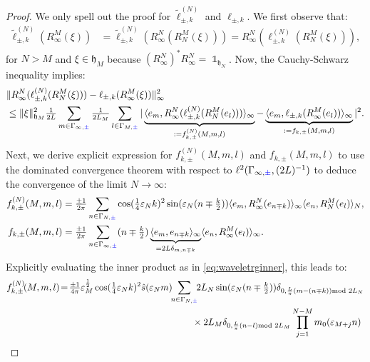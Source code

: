 \documentclass[a4paper, 11pt]{article}
\newcommand{\fh}{\mathfrak{h}}
\newcommand{\ltwo}{\ell^{2}}
\DeclareMathOperator{\1}{\mathds{1}}
\begin{document}
\begin{proof}
We only spell out the proof for $\tilde{\ell}^{(N)}_{\pm,k}$ and $\ell_{\pm,k}$. We first observe that:
\begin{align*}
\tilde{\ell}^{(N)}_{\pm,k}(R^{M}_{\infty}(\xi)) & = \tilde{\ell}^{(N)}_{\pm,k}(R^{N}_{\infty}(R^{M}_{N}(\xi))) = R^{N}_{\infty}(\ell^{(N)}_{\pm,k}(R^{M}_{N}(\xi))),
\end{align*}
for $N>M$ and $\xi\in\fh_{M}$ because $(R^{N}_{\infty})^{*}R^{N}_{\infty} = \1_{\fh_{N}}$. Now, the Cauchy-Schwarz inequality implies:
\begin{align*}
& \|R^{N}_{\infty}(\ell^{(N)}_{\pm,k}(R^{M}_{N}(\xi))) - \ell_{\pm,k}(R^{M}_{\infty}(\xi))\|_{\infty}^{2} \\ 
& \leq \|\xi\|_{\fh_{M}}^{2}\tfrac{1}{2L}\sum_{m\in\Gamma_{\infty,{\color{blue}\pm}}}\tfrac{1}{2L_{M}}\sum_{l\in\Gamma_{M,{\color{blue}\pm}}}|\underbrace{\langle e_{m},R^{N}_{\infty}(\ell^{(N)}_{\pm,k}(R^{M}_{N}(e_{l})))\rangle_{\infty}}_{:=f^{(N)}_{k,\pm}(M,m,l)}-\underbrace{\langle e_{m},\ell_{\pm,k}(R^{M}_{\infty}(e_{l}))\rangle_{\infty}}_{:=f_{k,\pm}(M,m,l)}|^{2}.
\end{align*}
Next, we derive explicit expression for $f^{(N)}_{k,\pm}(M,m,l)$ and $f_{k,\pm}(M,m,l)$ to use the dominated convergence theorem with respect to $\ltwo(\Gamma_{\infty,{\color{blue}\pm}},(2L)^{-1})$ to deduce the convergence of the limit $N\rightarrow\infty$:
\begin{align*}
f^{(N)}_{k,\pm}(M,m,l) & = \tfrac{\pm1}{2\pi}\sum_{n\in\Gamma_{N,{\color{blue}\pm}}}\cos(\tfrac{1}{4}\varepsilon_{N}k)^{2}\sin(\varepsilon_{N}(n\mp\tfrac{k}{2}))\langle e_{m},R^{N}_{\infty}(e_{n\mp k})\rangle_{\infty}\langle e_{n},R^{M}_{N}(e_{l})\rangle_{N}, \\
f_{k,\pm}(M,m,l) & = \tfrac{\pm1}{2\pi}\sum_{n\in\Gamma_{\infty,{\color{blue}\pm}}}(n\mp\tfrac{k}{2})\underbrace{\langle e_{m},e_{n\mp k}\rangle_{\infty}}_{=2L\delta_{m,n\mp k}}\langle e_{n},R^{M}_{\infty}(e_{l})\rangle_{\infty}.
\end{align*}
Explicitly evaluating the inner product as in \eqref{eq:waveletrginner}, this leads to:
\begin{align*}
f^{(N)}_{k,\pm}\!(M,m,l) &\!=\!\tfrac{\pm1}{4\pi}\vep_{M}^{\frac{1}{2}} \cos(\tfrac{1}{4}\vep_{N}k)^{2}\hat{s}(\vep_{N}m)\!\!\sum_{n\in\Gamma_{N,{\color{blue}\pm}}}\!\!2L_{N}\sin(\vep_{N}(n\mp\tfrac{k}{2}))\delta_{0,\frac{L}{\pi}(m-(n\mp k))\!\!\!\!\mod 2L_{N}} \\
& \hspace{5cm} \times 2L_{M}\delta_{0,\frac{L}{\pi}(n-l)\!\!\!\!\mod 2L_{M}}\prod_{j=1}^{N-M}m_{0}(\vep_{M+j}n) \\

\end{align*}
\end{proof}
\end{document}
